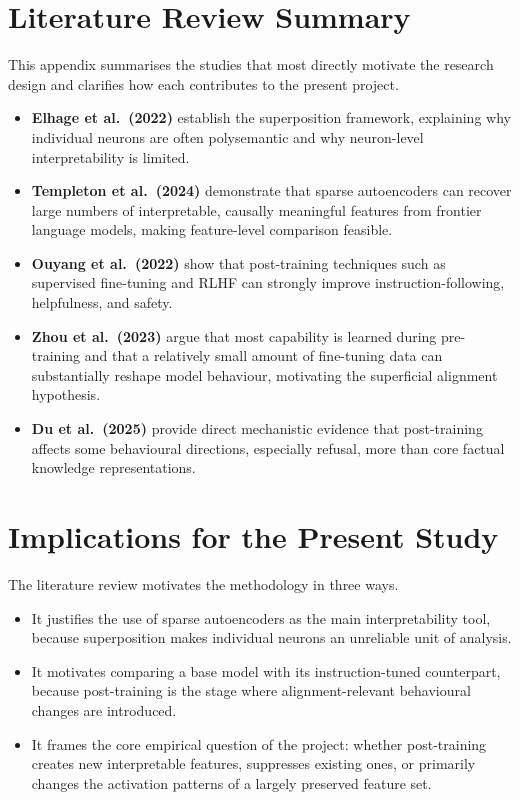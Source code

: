 \begin{appendices}

\section{Literature Review Summary}
\label{sec:appendix-literature-summary}

This appendix summarises the studies that most directly motivate the research design and clarifies how each contributes to the present project.

\begin{itemize}
    \item \textbf{Elhage et al.\ (2022)} \parencite{elhage_toy_2022} establish the superposition framework, explaining why individual neurons are often polysemantic and why neuron-level interpretability is limited.
    \item \textbf{Templeton et al.\ (2024)} \parencite{templeton_scaling_2024} demonstrate that sparse autoencoders can recover large numbers of interpretable, causally meaningful features from frontier language models, making feature-level comparison feasible.
    \item \textbf{Ouyang et al.\ (2022)} \parencite{ouyang_training_2022} show that post-training techniques such as supervised fine-tuning and RLHF can strongly improve instruction-following, helpfulness, and safety.
    \item \textbf{Zhou et al.\ (2023)} \parencite{zhou_lima_2023} argue that most capability is learned during pre-training and that a relatively small amount of fine-tuning data can substantially reshape model behaviour, motivating the superficial alignment hypothesis.
    \item \textbf{Du et al.\ (2025)} \parencite{du_how_2025} provide direct mechanistic evidence that post-training affects some behavioural directions, especially refusal, more than core factual knowledge representations.
\end{itemize}

\section{Implications for the Present Study}
\label{sec:appendix-literature-implications}

The literature review motivates the methodology in three ways.

\begin{itemize}
    \item It justifies the use of sparse autoencoders as the main interpretability tool, because superposition makes individual neurons an unreliable unit of analysis.
    \item It motivates comparing a base model with its instruction-tuned counterpart, because post-training is the stage where alignment-relevant behavioural changes are introduced.
    \item It frames the core empirical question of the project: whether post-training creates new interpretable features, suppresses existing ones, or primarily changes the activation patterns of a largely preserved feature set.
\end{itemize}

\end{appendices}
